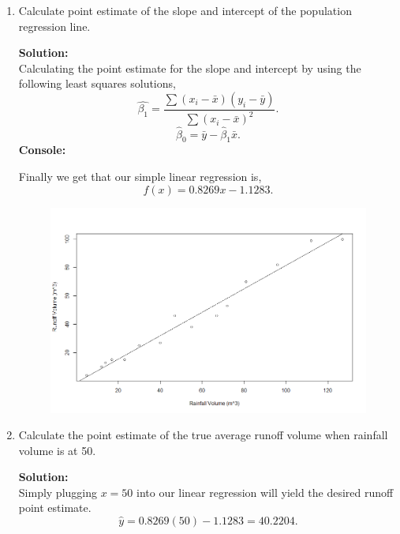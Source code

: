 \documentclass[12pt]{article}
\makeatletter
\theoremstyle{homework}
\newenvironment{exercise}[1]
{\def\@currentlabel{#1}\exercisecore}
{\endexercisecore}
\newcommand{\localhead}[1]{\par\smallskip\noindent\textbf{#1}\nobreak\\}%
\newcommand\solution{\localhead{Solution:}}
\makeatother
\begin{document}
\begin{exercise}{12.16}
\begin{enumerate}
    \item Calculate point estimate of the slope and intercept of the population regression line.\\
    \solution Calculating the point estimate for the slope and intercept by using the following least squares solutions,
    \begin{equation*}
      \hat{\beta_1}  = \dfrac{\sum(x_i - \bar{x})(y_i - \bar{y})}{\sum(x_i - \bar{x})^2}.
    \end{equation*}
    \begin{equation*}
      \hat\beta_0  = \bar{y} - \hat\beta_1\bar{x}.
    \end{equation*}
    \textbf{Console:}
    \begin{center}
    
    \end{center}
    Finally we get that our simple linear regression is,
    \begin{equation*}
      f(x) = 0.8269x - 1.1283.
    \end{equation*}
    \begin{figure}[H]
      \includegraphics[width = \textwidth]{scatterregression.png}  
      \centering
    \end{figure}
    \vspace{.25in}


    \item Calculate the point estimate of the true average runoff volume when rainfall volume is at 50.\\
    \solution Simply plugging $x = 50$ into our linear regression will yield the desired runoff point estimate.
    \begin{equation*}
      \hat{y} = 0.8269(50) - 1.1283 = 40.2204.
    \end{equation*}


\end{enumerate}
\end{exercise}
\end{document}

